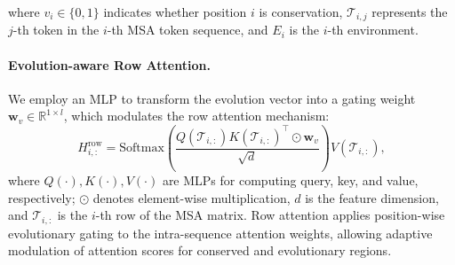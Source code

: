 where $v_i \in \{0,1\}$ indicates whether position $i$ is conservation, $\mathcal{T}_{i,j}$ represents the $j$-th token in the $i$-th MSA token sequence, and $E_i$ is the $i$-th environment. 











\paragraph{Evolution-aware Row Attention.} 
We employ an MLP to transform the evolution vector into a gating weight \(\boldsymbol{w}_v \in \mathbb{R}^{1 \times l}\), which modulates the row attention mechanism:  
\begin{equation}
    H^{\text{row}}_{i,:} = \text{Softmax} \left( \frac{Q(\mathcal{T}_{i,:}) K(\mathcal{T}_{i,:})^\top \odot \boldsymbol{w}_v}{\sqrt{d}} \right) V(\mathcal{T}_{i,:}),
\end{equation}
where \( Q(\cdot), K(\cdot), V(\cdot) \) are MLPs for computing query, key, and value, respectively; $\odot$ denotes element-wise multiplication, \( d \) is the feature dimension, and \(\mathcal{T}_{i,:}\) is the \(i\)-th row of the MSA matrix.
Row attention applies position-wise evolutionary gating to the intra-sequence attention weights, allowing adaptive modulation of attention scores for conserved and evolutionary regions.


